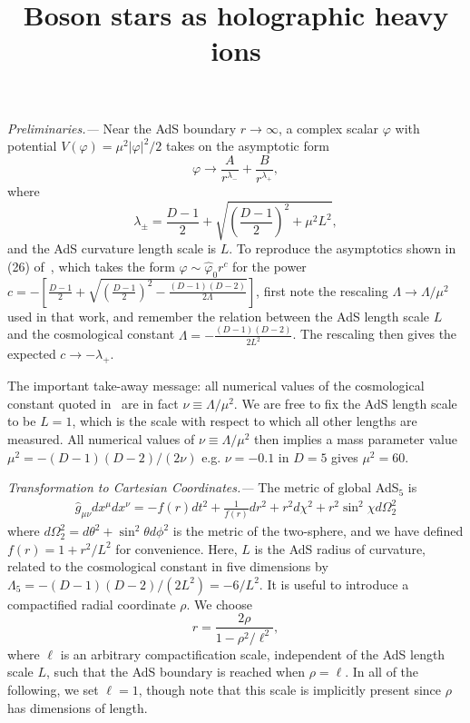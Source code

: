 \documentclass[prl,twocolumn,superscriptaddress]{revtex4-1}
\newcommand{\PRLsection}[1]{\emph{#1.---}}
\begin{document}
\title{Boson stars as holographic heavy ions}

\author{}

\maketitle

\PRLsection{Preliminaries}
Near the AdS boundary $r\rightarrow\infty$, a complex scalar $\varphi$ with potential $V(\varphi)=\mu^2 |\varphi|^2 /2$ takes on the asymptotic form\cite{Henneaux:2006hk,Marolf:2006nd}
\begin{equation}
\varphi \rightarrow \frac{A}{r^{\lambda_-}} + \frac{B}{r^{\lambda_+}},
\end{equation}
where 
\begin{equation}
\lambda_{\pm} = \frac{D-1}{2}+\sqrt{\left( \frac{D-1}{2} \right)^2 + \mu^2 L^2},
\end{equation}
and the AdS curvature length scale is $L$. 
To reproduce the asymptotics shown in (26) of~\cite{Astefanesei:2003qy}, which takes the form $\varphi \sim \hat{\varphi}_0 r^c$ for the power $c=-\left[ \frac{D-1}{2} + \sqrt{\left( \frac{D-1}{2} \right)^2 - \frac{(D-1)(D-2)}{2\Lambda}} \right]$, first note the rescaling $\Lambda \rightarrow \Lambda/\mu^2$ used in that work, and remember the relation between the AdS length scale $L$ and the cosmological constant $\Lambda=-\frac{(D-1)(D-2)}{2 L^2}$.
The rescaling then gives the expected $c\rightarrow -\lambda_+$.

The important take-away message: all numerical values of the cosmological constant quoted in~\cite{Astefanesei:2003qy} are in fact $\nu\equiv\Lambda/\mu^2$. 
We are free to fix the AdS length scale to be $L=1$, which is the scale with respect to which all other lengths are measured. 
All numerical values of $\nu\equiv\Lambda/\mu^2$ then implies a mass parameter value $\mu^2=-(D-1)(D-2)/(2\nu)$ e.g. $\nu=-0.1$ in $D=5$ gives $\mu^2=60$.

\PRLsection{Transformation to Cartesian Coordinates}
The metric of global AdS$_5$ is
\begin{eqnarray}\label{eqn:originalmetric}
\hat{g}_{\mu\nu} dx^\mu dx^\nu = - f(r) dt^2 + \frac{1}{f(r)} dr^2 +r^2 d\chi^2 + r^2 \sin^2\chi d\Omega^2_2 \nonumber
\end{eqnarray}
where $d\Omega^2_2=d\theta^2 + \sin^2\theta d\phi^2$ is the metric of the two-sphere, and we have defined $f(r)=1+r^2/L^2$ for convenience. 
Here, $L$ is the AdS radius of curvature, related to the cosmological constant in five dimensions by $\Lambda_5 = -(D-1)(D-2)/(2 L^2) = -6/L^2$. 
It is useful to introduce a compactified radial coordinate $\rho$. We choose
\begin{equation}\label{eqn:r_def}
r=\frac{2\rho}{1-\rho^2/\ell^2},
\end{equation}
where $\ell$ is an arbitrary compactification scale, independent of the AdS length scale $L$, such that the AdS boundary is reached when $\rho=\ell$. 
In all of the following, we set $\ell=1$, though note that this scale is implicitly present since $\rho$ has dimensions of length. 
\end{document}
